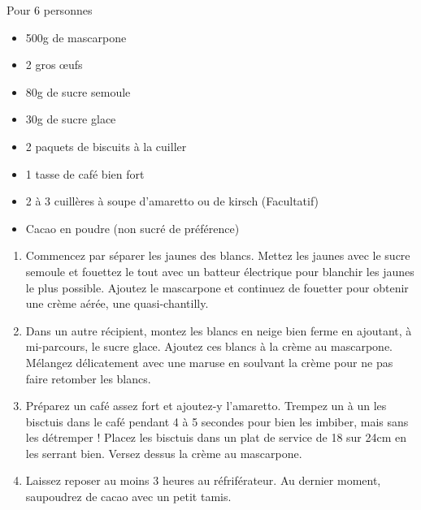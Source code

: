 \medskip
{}
{Pour 6 personnes}{\begin{itemize}
\item 500g de mascarpone
\item 2 gros \oe ufs
\item 80g de sucre semoule
\item 30g de sucre glace
\item 2 paquets de biscuits à la cuiller
\item 1 tasse de café bien fort
\item 2 à 3 cuillères à soupe d'amaretto ou de kirsch (Facultatif)
\item Cacao en poudre (non sucré de préférence)
\end{itemize}}
{\begin{enumerate}
\item Commencez par séparer les jaunes des blancs. Mettez les jaunes avec  le sucre semoule et fouettez le tout avec un batteur électrique pour blanchir les jaunes le plus possible. Ajoutez le mascarpone et continuez de fouetter pour obtenir une crème aérée, une quasi-chantilly.
\item Dans un autre récipient, montez les blancs en neige bien ferme en ajoutant, à mi-parcours, le sucre glace. Ajoutez ces blancs à la crème au mascarpone. Mélangez délicatement avec une maruse en soulvant la crème pour ne pas faire retomber les blancs.
\item Préparez un café assez fort et ajoutez-y l'amaretto. Trempez un à un les bisctuis dans le café pendant 4 à 5 secondes pour bien les imbiber, mais sans les détremper ! Placez les bisctuis dans un plat de service de 18 sur 24cm en les serrant bien. Versez dessus la crème au mascarpone.
\item Laissez reposer au moins 3 heures au réfriférateur. Au dernier moment, saupoudrez de cacao avec un petit tamis. 
\end{enumerate}}

